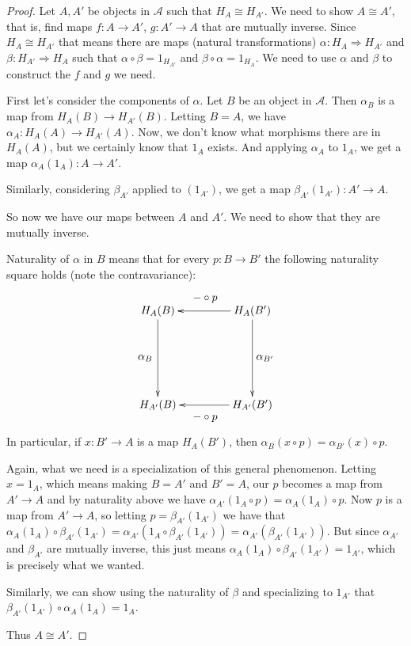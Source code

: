 \documentclass[11pt]{article}
\theoremstyle{definition}
\theoremstyle{definition}
\theoremstyle{plain}
\theoremstyle{plain}
\theoremstyle{plain}
\begin{document}
\begin{proof}
Let $A,A'$ be objects in $\mathscr{A}$ such that $H_A \cong H_{A'}$. We need to show $A \cong A'$, that is, find maps $f: A \to A'$, $g: A' \to A$ that are mutually inverse. Since $H_A \cong H_{A'}$ that means there are maps (natural transformations) $\alpha:H_A \Rightarrow H_{A'}$ and $\beta:H_{A'} \Rightarrow H_A$ such that $\alpha \circ \beta = 1_{H_{A'}}$ and $\beta \circ \alpha = 1_{H_A}$. We need to use $\alpha$ and $\beta$ to construct the $f$ and $g$ we need. 

First let's consider the components of $\alpha$. Let $B$ be an object in $\mathscr{A}$. Then $\alpha_B$ is a map from $H_A(B) \to H_{A'}(B)$. Letting $B=A$, we have $\alpha_A:H_A(A) \to H_{A'}(A)$. Now, we don't know what morphisms there are in $H_A(A)$, but we certainly know that $1_A$ exists. And applying $\alpha_A$ to $1_A$, we get a map $\alpha_A(1_A):A \to A'$.

Similarly, considering $\beta_{A'}$ applied to $(1_{A'})$, we get a map $\beta_{A'}(1_{A'}):A' \to A$.

So now we have our maps between $A$ and $A'$. We need to show that they are mutually inverse.

Naturality of $\alpha$ in $B$ means that for every $p: B \to B'$ the following naturality square holds (note the contravariance):

\begin{equation*}
\begin{xy}
(0,0)*+{H_A(B)}="v1"; (30,0)*+{H_A(B')}="v2"; (0,-30)*+{H_{A'}(B)}="v3"; (30,-30)*+{H_{A'}(B')}="v4";
{\ar "v1";"v3"}?*!/^4mm/{\alpha_B};
{\ar "v2";"v1"}?*!/^4mm/{- \circ p};
{\ar "v2";"v4"}?*!/_4mm/{\alpha_{B'}};
{\ar "v4";"v3"}?*!/_4mm/{- \circ p};
\end{xy}
\end{equation*}

In particular, if $x:B' \to A$ is a map $H_A(B')$, then $\alpha_B(x \circ p) = \alpha_{B'}(x) \circ p$.

Again, what we need is a specialization of this general phenomenon. Letting $x=1_A$, which means making $B = A'$ and $B' = A$, our $p$ becomes a map from $A' \to A$ and by naturality above we have $\alpha_{A'}(1_A \circ p) = \alpha_A(1_A) \circ p$. Now $p$ is a map from $A' \to A$, so letting $p = \beta_{A'}(1_{A'})$ we have that $\alpha_A(1_A) \circ \beta_{A'}(1_{A'}) = \alpha_{A'}(1_A \circ \beta_{A'}(1_{A'})) = \alpha_{A'}(\beta_{A'}(1_{A'}))$. But since $\alpha_{A'}$ and $\beta_{A'}$ are mutually inverse, this just means $\alpha_A(1_A) \circ \beta_{A'}(1_{A'}) = 1_{A'}$, which is precisely what we wanted.

Similarly, we can show using the naturality of $\beta$ and specializing to $1_{A'}$ that $\beta_{A'}(1_{A'}) \circ \alpha_A(1_A) = 1_A$.

Thus $A \cong A'$.
\end{proof}
\end{document}
